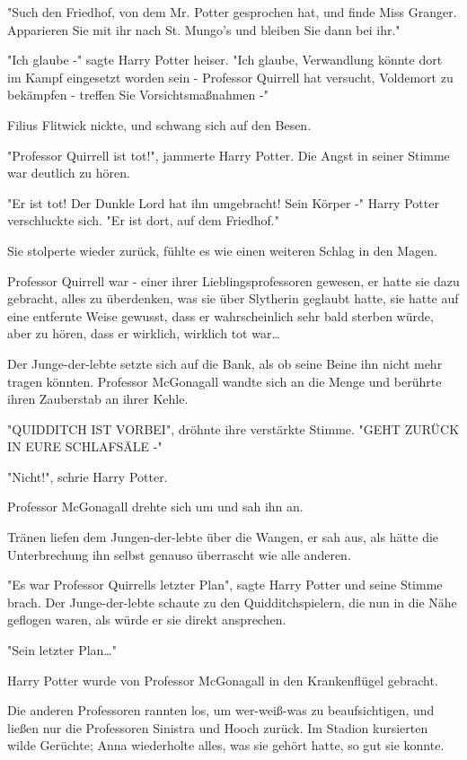 {"Such den Friedhof, von dem Mr. Potter gesprochen hat, und finde Miss Granger. Apparieren Sie mit ihr nach St. Mungo's und bleiben Sie dann bei ihr."

"Ich glaube -" sagte Harry Potter heiser. "Ich glaube, Verwandlung könnte dort im Kampf eingesetzt worden sein - Professor Quirrell hat versucht, Voldemort zu bekämpfen - treffen Sie Vorsichtsmaßnahmen -"

Filius Flitwick nickte, und schwang sich auf den Besen.

"Professor Quirrell ist tot!", jammerte Harry Potter. Die Angst in seiner Stimme war deutlich zu hören.

"Er ist tot! Der Dunkle Lord hat ihn umgebracht! Sein Körper -" Harry Potter verschluckte sich. "Er ist dort, auf dem Friedhof."

Sie stolperte wieder zurück, fühlte es wie einen weiteren Schlag in den Magen.

Professor Quirrell war - einer ihrer Lieblingsprofessoren gewesen, er hatte sie dazu gebracht, alles zu überdenken, was sie über Slytherin geglaubt hatte, sie hatte auf eine entfernte Weise gewusst, dass er wahrscheinlich sehr bald sterben würde, aber zu hören, dass er wirklich, wirklich tot war…

Der Junge-der-lebte setzte sich auf die Bank, als ob seine Beine ihn nicht mehr tragen könnten. Professor McGonagall wandte sich an die Menge und berührte ihren Zauberstab an ihrer Kehle.

"QUIDDITCH IST VORBEI", dröhnte ihre verstärkte Stimme. "GEHT ZURÜCK IN EURE SCHLAFSÄLE -"

"Nicht!", schrie Harry Potter.

Professor McGonagall drehte sich um und sah ihn an.

Tränen liefen dem Jungen-der-lebte über die Wangen, er sah aus, als hätte die Unterbrechung ihn selbst genauso überrascht wie alle anderen.

"Es war Professor Quirrells letzter Plan", sagte Harry Potter und seine Stimme brach. Der Junge-der-lebte schaute zu den Quidditchspielern, die nun in die Nähe geflogen waren, als würde er sie direkt ansprechen.

"Sein letzter Plan…"

Harry Potter wurde von Professor McGonagall in den Krankenflügel gebracht.

Die anderen Professoren rannten los, um wer-weiß-was zu beaufsichtigen, und ließen nur die Professoren Sinistra und Hooch zurück. Im Stadion kursierten wilde Gerüchte; Anna wiederholte alles, was sie gehört hatte, so gut sie konnte.

}
